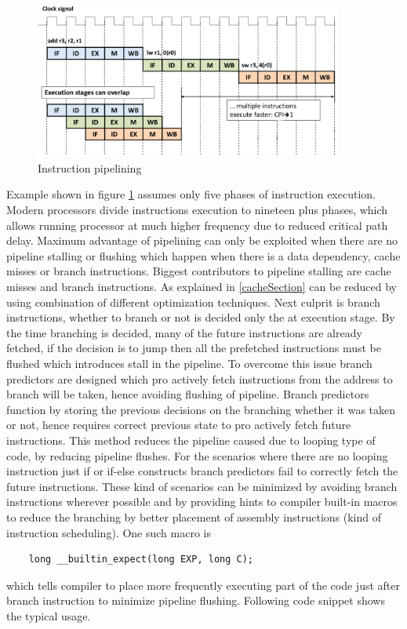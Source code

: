 \begin{figure}[h]
	\centering
	\includegraphics[width=0.9\textwidth]{./figures/pipeline_seq2_edited.pdf}
	\caption{Instruction pipelining}
	\label{fig:pipeline}
\end{figure}

Example shown in figure \ref{fig:pipeline} assumes only five phases of instruction execution. Modern processors divide instructions execution to nineteen plus phases, which allows running processor at much higher frequency due to reduced critical path delay. Maximum advantage of pipelining can only be exploited when there are no pipeline stalling or flushing which happen when there is a data dependency, cache misses or branch instructions. Biggest contributors to pipeline stalling are cache misses and branch instructions. As explained in \ref{cacheSection} can be reduced by using combination of different optimization techniques. Next culprit is branch instructions, whether to branch or not is decided only the at execution stage. By the time branching is decided, many of the future instructions are already fetched, if the decision is to jump then all the prefetched instructions must be flushed which introduces stall in the pipeline. To overcome this issue branch predictors are designed which pro actively fetch instructions from the address to branch will be taken, hence avoiding flushing of pipeline. Branch predictors function by storing the previous decisions on the branching whether it was taken or not, hence requires correct previous state to pro actively fetch future instructions. This method reduces the pipeline caused due to looping type of code, by reducing pipeline flushes. For the scenarios where there are no looping instruction just if or if-else constructs branch predictors fail to correctly fetch the future instructions. These kind of scenarios can be minimized by avoiding branch instructions wherever possible and by providing hints to compiler built-in macros to reduce the branching by better placement of assembly instructions (kind of instruction scheduling). One such macro is 
\begin{verbatim}
	long __builtin_expect(long EXP, long C); 
\end{verbatim}
which tells compiler to place more frequently executing part of the code just after branch instruction to minimize pipeline flushing. Following code snippet shows the typical usage.

